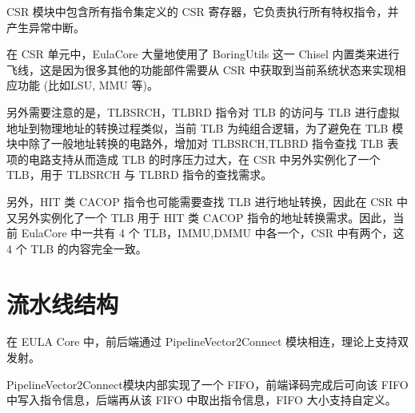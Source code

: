 CSR 模块中包含所有指令集定义的 CSR 寄存器，它负责执行所有特权指令，并产生异常中断。

在 CSR 单元中，EulaCore 大量地使用了 BoringUtils 这一 Chisel 内置类来进行飞线，这是因为很多其他的功能部件需要从 CSR 中获取到当前系统状态来实现相应功能 (比如LSU, MMU 等)。

另外需要注意的是，TLBSRCH，TLBRD 指令对 TLB 的访问与 TLB 进行虚拟地址到物理地址的转换过程类似，当前 TLB 为纯组合逻辑，为了避免在 TLB 模块中除了一般地址转换的电路外，增加对 TLBSRCH,TLBRD 指令查找 TLB 表项的电路支持从而造成 TLB 的时序压力过大，在 CSR 中另外实例化了一个 TLB，用于 TLBSRCH 与 TLBRD 指令的查找需求。

另外，HIT 类 CACOP 指令也可能需要查找 TLB 进行地址转换，因此在 CSR 中又另外实例化了一个 TLB 用于 HIT 类 CACOP 指令的地址转换需求。因此，当前 EulaCore 中一共有 4 个 TLB，IMMU,DMMU 中各一个，CSR 中有两个，这 4 个 TLB 的内容完全一致。

\section{流水线结构}\label{sec:03-base-cpu-007}

在 EULA Core 中，前后端通过 PipelineVector2Connect 模块相连，理论上支持双发射。

PipelineVector2Connect模块内部实现了一个 FIFO，前端译码完成后可向该 FIFO 中写入指令信息，后端再从该 FIFO 中取出指令信息，FIFO 大小支持自定义。

